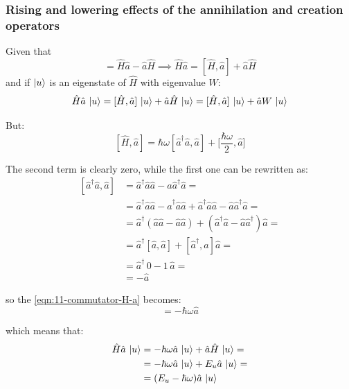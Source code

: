 \subsubsection{Rising and lowering effects of the annihilation and creation operators}

Given that 
\begin{equation}
    [\hat{H},\hat{a}] = \hat{H}\hat{a}-\hat{a}\hat{H} \implies \hat{H}\hat{a} = [\hat{H},\hat{a}]+\hat{a}\hat{H}
\end{equation}
and if $\ket{u}$ is an eigenstate of $\hat{H}$ with eigenvalue $W$:
\begin{equation}
\hat{H}\hat{a}\, \ket{u} = [\hat{H},\hat{a}]\, \ket{u}+\hat{a}\hat{H}\, \ket{u} = [\hat{H},\hat{a}]\, \ket{u}+\hat{a}W\, \ket{u}
\end{equation}

But: 
\begin{equation}\label{eqn:11-commutator-H-a}
    [\hat{H},\hat{a}] = \hbar \omega [\hat{a}^\dagger\hat{a}, \hat{a}]+
    \bigl[\frac{\hbar \omega }2{,\hat{a}}\bigr]
\end{equation}

The second term is clearly zero, while the first one can be rewritten as:
\begin{equation}
\begin{split}
    [\hat{a}^\dagger\hat{a},\hat{a}] &= \hat{a}^\dagger\hat{a}\hat{a}- \hat{a}\hat{a}^\dagger\hat{a} = \\
    &=\hat{a}^\dagger\hat{a}\hat{a}-\hat{a}^\dagger\hat{a}\hat{a}+\hat{a}^\dagger\hat{a}\hat{a}- \hat{a}\hat{a}^\dagger\hat{a} = \\
    &=\hat{a}^\dagger(\hat{a}\hat{a}-\hat{a}\hat{a})+(\hat{a}^\dagger\hat{a}-\hat{a}\hat{a}^\dagger)\hat{a} = \\
    &=\hat{a}^\dagger[\hat{a},\hat{a}]+[\hat{a}^\dagger,\hat{a}]\hat{a} = \\
    &=\hat{a}^\dagger\, 0 -1\, \hat{a} = \\
    &= - \hat{a}
\end{split}
\end{equation}

so the \eqref{eqn:11-commutator-H-a} becomes:
\begin{equation}
[\hat{H},\hat{a}]= -\hbar \omega \hat{a}
\end{equation}

which means that:
\begin{equation}
\begin{split}
    \hat{H}\hat{a} \, \ket{u} &= 
    -\hbar \omega \hat{a}\, \ket{u}+ \hat{a}\hat{H}\, \ket{u} = \\
    &= -\hbar \omega \hat{a}\, \ket{u}+ E_u\hat{a}\, \ket{u} = \\
    &= (E_u -\hbar \omega) \hat{a}\, \ket{u}\\
\end{split}
\end{equation}

